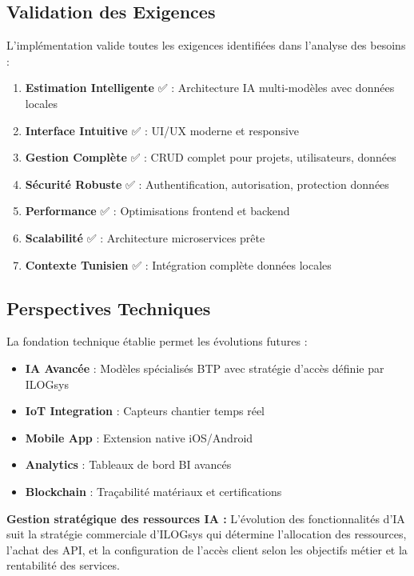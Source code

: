 \subsection{Validation des Exigences}

L'implémentation valide toutes les exigences identifiées dans l'analyse des besoins :

\begin{enumerate}
    \item \textbf{Estimation Intelligente} ✅ : Architecture IA multi-modèles avec données locales
    \item \textbf{Interface Intuitive} ✅ : UI/UX moderne et responsive
    \item \textbf{Gestion Complète} ✅ : CRUD complet pour projets, utilisateurs, données
    \item \textbf{Sécurité Robuste} ✅ : Authentification, autorisation, protection données
    \item \textbf{Performance} ✅ : Optimisations frontend et backend
    \item \textbf{Scalabilité} ✅ : Architecture microservices prête
    \item \textbf{Contexte Tunisien} ✅ : Intégration complète données locales
\end{enumerate}

\subsection{Perspectives Techniques}

La fondation technique établie permet les évolutions futures :
\begin{itemize}
    \item \textbf{IA Avancée} : Modèles spécialisés BTP avec stratégie d'accès définie par ILOGsys
    \item \textbf{IoT Integration} : Capteurs chantier temps réel
    \item \textbf{Mobile App} : Extension native iOS/Android
    \item \textbf{Analytics} : Tableaux de bord BI avancés
    \item \textbf{Blockchain} : Traçabilité matériaux et certifications
\end{itemize}

\textbf{Gestion stratégique des ressources IA :}
L'évolution des fonctionnalités d'IA suit la stratégie commerciale d'ILOGsys qui détermine l'allocation des ressources, l'achat des API, et la configuration de l'accès client selon les objectifs métier et la rentabilité des services.

